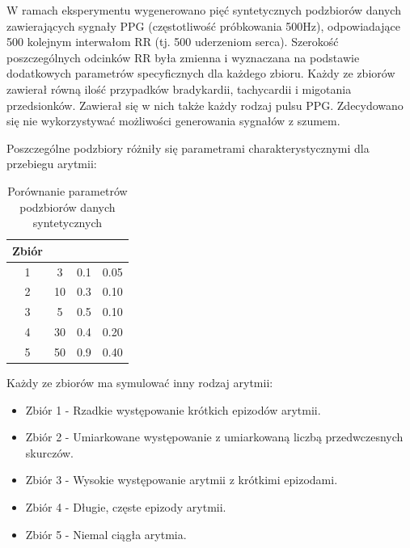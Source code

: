 \documentclass[a4paper,twoside,12pt]{book}
\begin{document}
W ramach eksperymentu wygenerowano pięć syntetycznych podzbiorów danych zawierających sygnały PPG (częstotliwość próbkowania 500Hz), odpowiadające 500 kolejnym interwałom RR (tj. 500 uderzeniom serca). Szerokość poszczególnych odcinków RR była zmienna i wyznaczana na podstawie dodatkowych parametrów specyficznych dla każdego zbioru. Każdy ze zbiorów zawierał równą ilość przypadków bradykardii, tachycardii i migotania przedsionków. Zawierał się w nich także każdy rodzaj pulsu PPG. Zdecydowano się nie wykorzystywać możliwości generowania sygnałów z szumem.
\newpage

Poszczególne podzbiory różniły się parametrami charakterystycznymi dla przebiegu arytmii:

\begin{table}[!ht]
	\centering
	\caption{Porównanie parametrów podzbiorów danych syntetycznych}
	\begin{tabular}{
			@{}c
			S[table-format=2.0]
			S[table-format=1.1]
			S[table-format=1.2]
			@{}
		}
		\toprule
		Zbiór &
		 &
		 &
		 \\
		     & 3  & 0.1 & 0.05                              \\
		2     & 10 & 0.3 & 0.10                              \\
		3     & 5  & 0.5 & 0.10                              \\
		4     & 30 & 0.4 & 0.20                              \\
		5     & 50 & 0.9 & 0.40                              \\
		\bottomrule
	\end{tabular}
\end{table}

Każdy ze zbiorów ma symulować inny rodzaj arytmii:
\begin{itemize}
	\item Zbiór 1 - Rzadkie występowanie krótkich epizodów arytmii.
	\item Zbiór 2 - Umiarkowane występowanie z umiarkowaną liczbą przedwczesnych skurczów.
	\item Zbiór 3 - Wysokie występowanie arytmii z krótkimi epizodami.
	\item Zbiór 4 - Długie, częste epizody arytmii.
	\item Zbiór 5 - Niemal ciągła arytmia.
\end{itemize}
\end{document}
